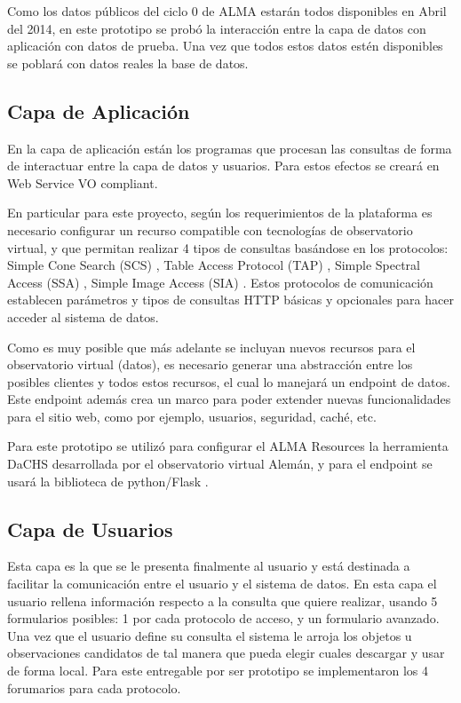 Como los datos públicos del ciclo 0 de ALMA estarán todos disponibles en Abril
del 2014, en este prototipo se probó la interacción entre la capa de datos con
aplicación con datos de prueba. Una vez que todos estos datos estén disponibles
se poblará con datos reales la base de datos.

\subsection{Capa de Aplicación}
En la capa de aplicación están los programas que procesan las consultas de
forma de interactuar entre la capa de datos y usuarios. Para estos efectos se
creará en Web Service VO compliant.

En particular para este proyecto, según los requerimientos de la plataforma es
necesario configurar un recurso compatible con tecnologías de observatorio
virtual, y que permitan realizar 4 tipos de consultas basándose en los
protocolos: Simple Cone Search (SCS) \cite{scs}, Table Access Protocol (TAP)
\cite{tap}, Simple Spectral Access (SSA) \cite{ssa}, Simple Image Access (SIA)
\cite{sia}. Estos protocolos de comunicación establecen parámetros y tipos de
consultas HTTP básicas y opcionales para hacer acceder al sistema de datos.

Como es muy posible que más adelante se incluyan nuevos recursos para el
observatorio virtual (datos), es necesario generar una abstracción entre los
posibles clientes y todos estos recursos, el cual lo manejará un endpoint de
datos. Este endpoint además crea un marco para poder extender nuevas
funcionalidades para el sitio web, como por ejemplo, usuarios, seguridad,
caché, etc.

Para este prototipo se utilizó para configurar el ALMA Resources la herramienta
DaCHS \cite{dachs} desarrollada por el observatorio virtual Alemán, y para el
endpoint se usará la biblioteca de python/Flask \cite{flask}.

\subsection{Capa de Usuarios}
Esta capa es la que se le presenta finalmente al usuario y está destinada a
facilitar la comunicación entre el usuario y el sistema de datos. En esta capa
el usuario rellena información respecto a la consulta que quiere realizar,
usando 5 formularios posibles: 1 por cada protocolo de acceso, y un formulario
avanzado. Una vez que el usuario define su consulta el sistema le arroja los
objetos u observaciones candidatos de tal manera que pueda elegir cuales
descargar y usar de forma local. Para este entregable por ser prototipo se
implementaron los 4 forumarios para cada protocolo.

